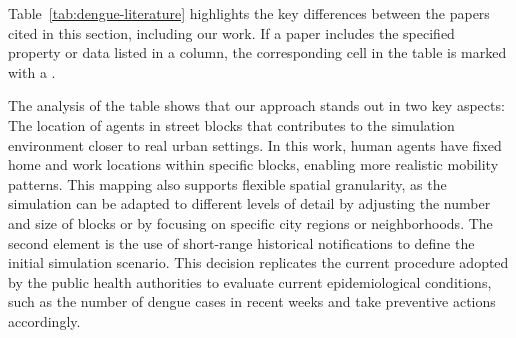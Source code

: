Table~\ref{tab:dengue-literature} highlights the key differences between the
papers cited in this section, including our work. If a paper includes the
specified property or data listed in a column, the corresponding cell in the
table is marked with a \checkmark.

The analysis of the table shows that our approach stands out in two key aspects:
The location of agents in street blocks that contributes to the simulation
environment closer to real urban settings. In this work, human agents have fixed
home and work locations within specific blocks, enabling more realistic mobility
patterns. This mapping also supports flexible spatial granularity, as the
simulation can be adapted to different levels of detail by adjusting the number
and size of blocks or by focusing on specific city regions or neighborhoods. The
second element is the use of short-range historical notifications to define the
initial simulation scenario. This decision replicates the current procedure
adopted by the public health authorities to evaluate current epidemiological
conditions, such as the number of dengue cases in recent weeks and take
preventive actions accordingly.

